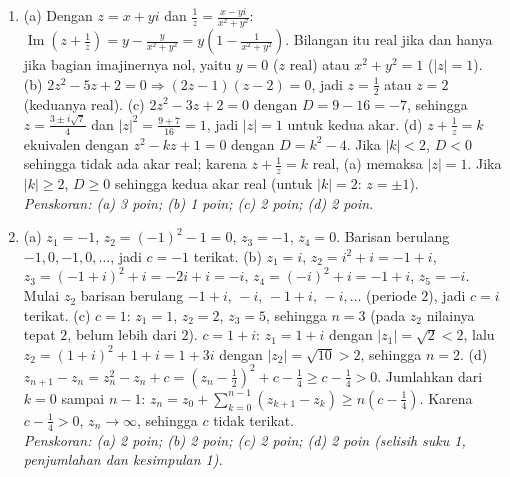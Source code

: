 \documentclass[a4paper,11pt]{article}
\renewcommand{\Im}{\operatorname{Im}}
\newcounter{no}
\begin{document}
\begin{enumerate}[leftmargin=2em,itemsep=3pt,topsep=2pt]
\item[\textbf{4.}] (a) Dengan $z=x+yi$ dan $\frac1z=\frac{x-yi}{x^2+y^2}$: $\Im\!\left(z+\frac1z\right)=y-\frac{y}{x^2+y^2}=y\left(1-\frac1{x^2+y^2}\right)$. Bilangan itu real jika dan hanya jika bagian imajinernya nol, yaitu $y=0$ ($z$ real) atau $x^2+y^2=1$ ($|z|=1$). (b) $2z^2-5z+2=0\Rightarrow(2z-1)(z-2)=0$, jadi $z=\frac12$ atau $z=2$ (keduanya real). (c) $2z^2-3z+2=0$ dengan $D=9-16=-7$, sehingga $z=\frac{3\pm i\sqrt7}{4}$ dan $|z|^2=\frac{9+7}{16}=1$, jadi $|z|=1$ untuk kedua akar. (d) $z+\frac1z=k$ ekuivalen dengan $z^2-kz+1=0$ dengan $D=k^2-4$. Jika $|k|<2$, $D<0$ sehingga tidak ada akar real; karena $z+\frac1z=k$ real, (a) memaksa $|z|=1$. Jika $|k|\ge2$, $D\ge0$ sehingga kedua akar real (untuk $|k|=2$: $z=\pm1$). \\ \textit{Penskoran: (a) 3 poin; (b) 1 poin; (c) 2 poin; (d) 2 poin.}
\item[\textbf{5.}] (a) $z_1=-1$, $z_2=(-1)^2-1=0$, $z_3=-1$, $z_4=0$. Barisan berulang $-1,0,-1,0,\dots$, jadi $c=-1$ terikat. (b) $z_1=i$, $z_2=i^2+i=-1+i$, $z_3=(-1+i)^2+i=-2i+i=-i$, $z_4=(-i)^2+i=-1+i$, $z_5=-i$. Mulai $z_2$ barisan berulang $-1+i,\,-i,\,-1+i,\,-i,\dots$ (periode $2$), jadi $c=i$ terikat. (c) $c=1$: $z_1=1$, $z_2=2$, $z_3=5$, sehingga $n=3$ (pada $z_2$ nilainya tepat $2$, belum lebih dari $2$). $c=1+i$: $z_1=1+i$ dengan $|z_1|=\sqrt2<2$, lalu $z_2=(1+i)^2+1+i=1+3i$ dengan $|z_2|=\sqrt{10}>2$, sehingga $n=2$. (d) $z_{n+1}-z_n=z_n^2-z_n+c=\left(z_n-\frac12\right)^2+c-\frac14\ge c-\frac14>0$. Jumlahkan dari $k=0$ sampai $n-1$: $z_n=z_0+\sum_{k=0}^{n-1}(z_{k+1}-z_k)\ge n\left(c-\frac14\right)$. Karena $c-\frac14>0$, $z_n\to\infty$, sehingga $c$ tidak terikat. \\ \textit{Penskoran: (a) 2 poin; (b) 2 poin; (c) 2 poin; (d) 2 poin (selisih suku 1, penjumlahan dan kesimpulan 1).}
\end{enumerate}
\end{document}
